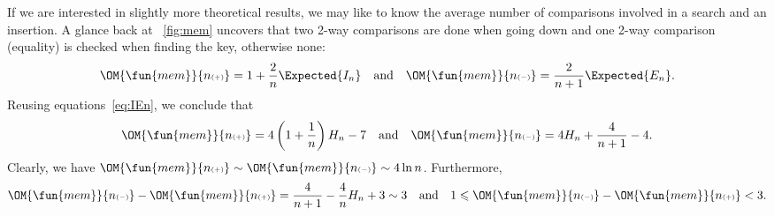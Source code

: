 If we are interested in slightly more theoretical results, we may like
to know the average number of comparisons involved in a search and an
insertion. A glance back at \fig~\vref{fig:mem} uncovers that two
2-way comparisons are done when going down and one 2-way comparison
(equality) is checked when finding the key, otherwise none:
\begin{equation}
\OM{\fun{mem}}{n{\scriptscriptstyle(+)}}
  = 1 + \frac{2}{n}\Expected{I_n}
\quad\text{and}\quad
\OM{\fun{mem}}{n{\scriptscriptstyle(-)}}
  = \frac{2}{n+1}\Expected{E_n}.
\label{eq:Mmem_cmp1}
\end{equation}
Reusing equations~\eqref{eq:IEn}, we conclude that
\begin{equation}
\OM{\fun{mem}}{n{\scriptscriptstyle(+)}}
  = 4\left(1+\frac{1}{n}\right)H_n - 7
\quad\text{and}\quad
\OM{\fun{mem}}{n{\scriptscriptstyle(-)}}
  = 4H_n + \frac{4}{n+1} - 4.
\index{mem@$\OM{\fun{mem}}{n{\scriptscriptstyle(-)}}$}
\index{mem@$\OM{\fun{mem}}{n{\scriptscriptstyle(+)}}$}
\label{eq:Mmem_cmp2}
\end{equation}
Clearly, we have \(\OM{\fun{mem}}{n{\scriptscriptstyle(+)}} \sim
\OM{\fun{mem}}{n{\scriptscriptstyle(-)}} \sim 4\ln n\). Furthermore,
\begin{equation*}
\OM{\fun{mem}}{n{\scriptscriptstyle (-)}} -
\OM{\fun{mem}}{n{\scriptscriptstyle (+)}} =
\frac{4}{n+1} - \frac{4}{n}H_n + 3 \sim 3
\quad\text{and}\quad
1 \leqslant \OM{\fun{mem}}{n{\scriptscriptstyle (-)}} -
\OM{\fun{mem}}{n{\scriptscriptstyle (+)}} < 3.
\end{equation*}

